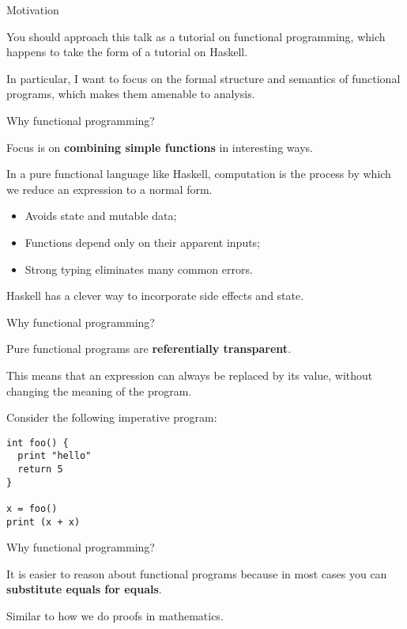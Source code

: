 
%
\begin{frame}{Motivation}

You should approach this talk as a tutorial on functional programming, which
happens to take the form of a tutorial on Haskell.

In particular, I want to focus on the formal structure and semantics of
functional programs, which makes them amenable to analysis.

\end{frame}

%
\begin{frame}{Why functional programming?}

Focus is on \textbf{combining simple functions} in interesting ways.

In a pure functional language like Haskell, computation is the process by which
we reduce an expression to a normal form.

\begin{itemize}
  \item Avoids state and mutable data;
  \item Functions depend only on their apparent inputs;
  \item Strong typing eliminates many common errors.
\end{itemize}

Haskell has a clever way to incorporate side effects and state.

\end{frame}

%
\begin{frame}[fragile]{Why functional programming?}

Pure functional programs are \textbf{referentially transparent}.

This means that an expression can always be replaced by its value, without
changing the meaning of the program.

Consider the following imperative program:

\begin{block}{}
\begin{verbatim}
int foo() {
  print "hello"
  return 5
}

x = foo()
print (x + x)
\end{verbatim}
\end{block}

\end{frame}

%
\begin{frame}[fragile]{Why functional programming?}

It is easier to reason about functional programs because in most cases you can
\textbf{substitute equals for equals}.

Similar to how we do proofs in mathematics.

\end{frame}

